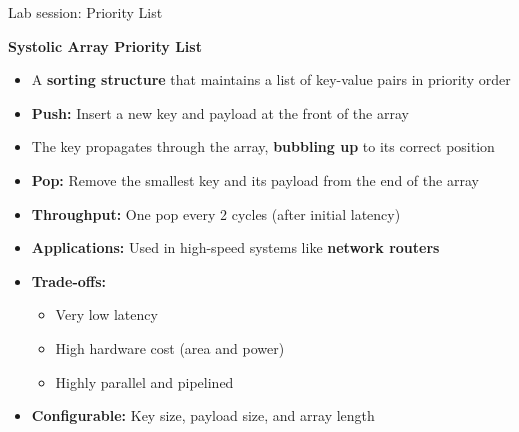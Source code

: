 \begin{frame}{Lab session: Priority List}
	
	\textbf{Systolic Array Priority List}
	
	\begin{itemize}
		\item A \textbf{sorting structure} that maintains a list of key-value pairs in priority order
		\pause
		\item \textbf{Push:} Insert a new key and payload at the front of the array
		\item The key propagates through the array, \textbf{bubbling up} to its correct position
		\item \textbf{Pop:} Remove the smallest key and its payload from the end of the array
		\pause
		\item \textbf{Throughput:} One pop every 2 cycles (after initial latency)
		\item \textbf{Applications:} Used in high-speed systems like \textbf{network routers}
		\item \textbf{Trade-offs:}
		\begin{itemize}
			\item Very low latency
			\item High hardware cost (area and power)
			\item Highly parallel and pipelined
		\end{itemize}
		\pause
		\item \textbf{Configurable:} Key size, payload size, and array length
	\end{itemize}
	
\end{frame}

